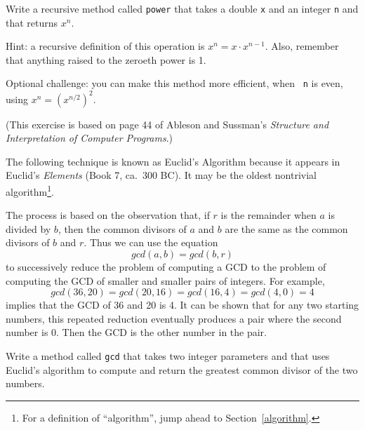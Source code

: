 \begin{exercise}
\label{ex.power}
Write a recursive method called {\tt power} that
takes a double {\tt x} and an integer {\tt n} and that
returns $x^n$.

Hint: a recursive definition of this
operation is $x^n = x \cdot x^{n-1}$.
Also, remember that anything raised to the zeroeth power
is 1.

Optional challenge: you can make this method more efficient, when {\tt
  n} is even, using $x^n = \left( x^{n/2} \right)^2$.

\end{exercise}


\begin{exercise}
\label{gcd}
(This exercise is based on page 44 of Ableson and Sussman's
{\em Structure and Interpretation of Computer Programs}.)

The following technique is known as Euclid's Algorithm because
it appears in Euclid's {\em Elements} (Book 7, ca.~300 BC).
It may be the oldest nontrivial algorithm\footnote{For a definition
of ``algorithm'', jump ahead to Section~\ref{algorithm}.}.

The process is based on the observation that, if $r$ is the
remainder when $a$ is divided by $b$, then the common divisors
of $a$ and $b$ are the same as the common divisors of $b$ and $r$.
Thus we can use the equation
%
\[ gcd(a, b) = gcd(b, r) \]
%
to successively reduce the problem of computing a GCD to the
problem of computing the GCD of smaller and smaller pairs of integers.
For example,
%
\[ gcd(36, 20) = gcd(20, 16) = gcd(16, 4) = gcd(4, 0) = 4 \]
%
implies that the GCD of 36 and 20 is 4.  It can be shown
that for any two starting numbers, this repeated reduction eventually
produces a pair where the second number is 0.  Then the GCD is the
other number in the pair.

Write a method called {\tt gcd} that takes two integer parameters and
that uses Euclid's algorithm to compute and return the greatest
common divisor of the two numbers.
\end{exercise}


